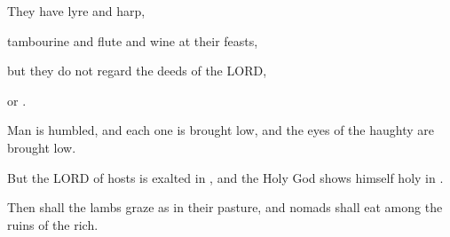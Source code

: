\documentclass[11pt]{article}
\begin{document}
\begin{chiasticoutline}[Isaiah 5:8-14 (B)]{.95em}{2em}
{         They have lyre and harp,

        \poetryline tambourine and flute and wine at their feasts,

        but they do not regard the deeds of the LORD,

        \poetryline or .
    }
     
    

\end{chiasticoutline}

\begin{biblicaloutline}[Isaiah 5:15-17 (C)]

    \begin{versesection}{2em}
         Man is humbled, and each one is brought low,
        \poetryline and the eyes of the haughty are brought low.
        
         But the LORD of hosts is exalted in ,
        \poetryline and the Holy God shows himself holy in .
        
         Then shall the lambs graze as in their pasture,
        \poetryline and nomads shall eat among the ruins of the rich.
    \end{versesection}

\end{biblicaloutline}
\end{document}
